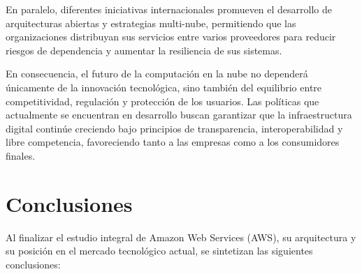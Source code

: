 \documentclass[12pt,a4paper]{article}
\begin{document}
En paralelo, diferentes iniciativas internacionales promueven el desarrollo de arquitecturas abiertas y estrategias multi-nube, permitiendo que las organizaciones distribuyan sus servicios entre varios proveedores para reducir riesgos de dependencia y aumentar la resiliencia de sus sistemas.

En consecuencia, el futuro de la computación en la nube no dependerá únicamente de la innovación tecnológica, sino también del equilibrio entre competitividad, regulación y protección de los usuarios. Las políticas que actualmente se encuentran en desarrollo buscan garantizar que la infraestructura digital continúe creciendo bajo principios de transparencia, interoperabilidad y libre competencia, favoreciendo tanto a las empresas como a los consumidores finales.\parencite{cma2025,eu_data_act_2023,eu_dma_2022}
\newpage
\section{Conclusiones}
Al finalizar el estudio integral de Amazon Web Services (AWS), su arquitectura y su posición en el mercado tecnológico actual, se sintetizan las siguientes conclusiones:
\end{document}
